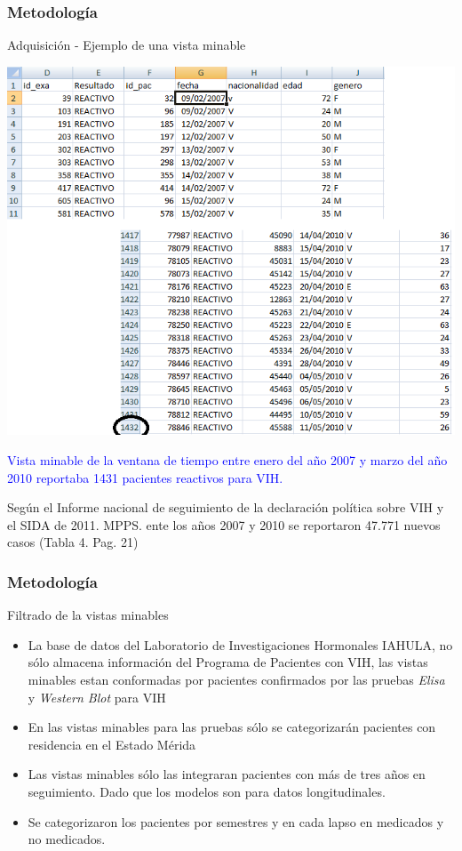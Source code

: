 \documentclass{beamer}%
\begin{document}
\begin{frame}
\frametitle{\textbf\textbf{Metodolog\'ia}}
\begin{block}{Adquisici\'on - Ejemplo de una vista minable}
\end{block}
\begin{center}\includegraphics[height=0.5\textheight]{VM1.PNG}\end{center}

\tiny{\textcolor{blue}{Vista minable de la ventana de tiempo entre enero del a\~no 2007 y marzo del a\~no 2010 reportaba 1431 pacientes reactivos para VIH.}}

\tiny{Seg\'un el Informe nacional de seguimiento de la declaraci\'on pol\'itica sobre VIH y el SIDA de 2011.  MPPS.  ente los a\~nos 2007 y 2010 se reportaron 47.771 nuevos casos (Tabla 4. Pag. 21)}

\end{frame}


\begin{frame}
\frametitle{\textbf\textbf{Metodolog\'ia}}
\begin{block}{Filtrado de la vistas minables}
\end{block}
\small{
\begin{itemize}
    \item La base de datos del Laboratorio de Investigaciones Hormonales IAHULA, no s\'olo almacena informaci\'on del Programa de Pacientes con VIH, las vistas minables estan conformadas por pacientes confirmados por las pruebas \textit{Elisa} y \textit{Western Blot} para VIH
    \item En las vistas minables para  las pruebas s\'olo se categorizar\'an pacientes con residencia en el Estado Mérida
    \item Las vistas minables s\'olo las integraran pacientes con m\'as de tres años en seguimiento. Dado que los modelos son para datos longitudinales.
    \item Se categorizaron los pacientes por semestres y en cada lapso en medicados y no medicados.
\end{itemize}
}
\end{frame}
\end{document}
